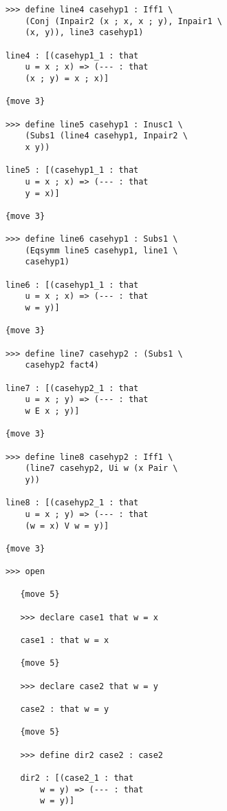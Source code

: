 \documentclass[12pt]{article}
\begin{document}
\begin{verbatim}
            >>> define line4 casehyp1 : Iff1 \
                (Conj (Inpair2 (x ; x, x ; y), Inpair1 \
                (x, y)), line3 casehyp1)

            line4 : [(casehyp1_1 : that 
                u = x ; x) => (--- : that 
                (x ; y) = x ; x)]

            {move 3}

            >>> define line5 casehyp1 : Inusc1 \
                (Subs1 (line4 casehyp1, Inpair2 \
                x y))

            line5 : [(casehyp1_1 : that 
                u = x ; x) => (--- : that 
                y = x)]

            {move 3}

            >>> define line6 casehyp1 : Subs1 \
                (Eqsymm line5 casehyp1, line1 \
                casehyp1)

            line6 : [(casehyp1_1 : that 
                u = x ; x) => (--- : that 
                w = y)]

            {move 3}

            >>> define line7 casehyp2 : (Subs1 \
                casehyp2 fact4)

            line7 : [(casehyp2_1 : that 
                u = x ; y) => (--- : that 
                w E x ; y)]

            {move 3}

            >>> define line8 casehyp2 : Iff1 \
                (line7 casehyp2, Ui w (x Pair \
                y))

            line8 : [(casehyp2_1 : that 
                u = x ; y) => (--- : that 
                (w = x) V w = y)]

            {move 3}

            >>> open

               {move 5}

               >>> declare case1 that w = x

               case1 : that w = x

               {move 5}

               >>> declare case2 that w = y

               case2 : that w = y

               {move 5}

               >>> define dir2 case2 : case2

               dir2 : [(case2_1 : that 
                   w = y) => (--- : that 
                   w = y)]


\end{verbatim}
\end{document}
